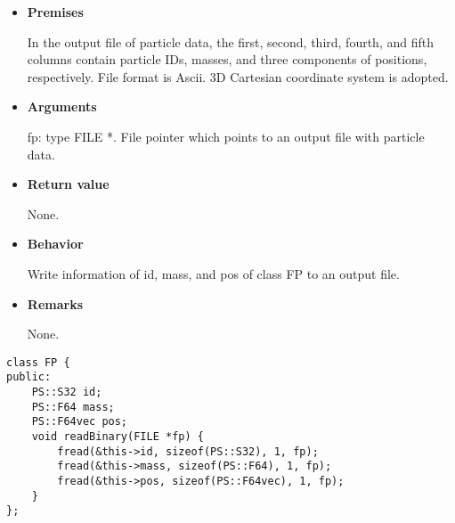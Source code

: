 \begin{itemize}

\item {\bf Premises}

  In the output file of particle data, the first, second, third,
  fourth, and fifth columns contain particle IDs, masses, and three components of positions, respectively. File format is Ascii. 3D Cartesian coordinate system is adopted.
  

\item {\bf Arguments}

  fp: type FILE *. File pointer which points to an output file with particle data.
  
\item {\bf Return value}

  None.
  
\item {\bf Behavior}

  Write information of id, mass, and pos of class FP to an output
  file.
  
\item {\bf Remarks}

  None.
  
\end{itemize}


\begin{screen}
\begin{verbatim}
class FP {
public:
    PS::S32 id;
    PS::F64 mass;
    PS::F64vec pos;
    void readBinary(FILE *fp) {
        fread(&this->id, sizeof(PS::S32), 1, fp);
        fread(&this->mass, sizeof(PS::F64), 1, fp);
        fread(&this->pos, sizeof(PS::F64vec), 1, fp);
    }
};
\end{verbatim}
\end{screen}

